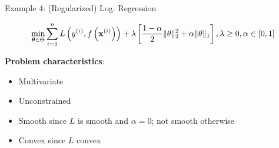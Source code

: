 \documentclass[11pt,compress,t,notes=noshow, xcolor=table]{beamer}
\begin{document}
\begin{vbframe}{Example 4: (Regularized) Log. Regression}
\framebreak

\begin{footnotesize}
\begin{eqnarray*}
	\min_{\bm{\theta} \in \Theta} \sum\limits_{i=1}^n L\left(y^{(i)}, f\left(\mathbf{x}^{(i)}\right)\right) + \lambda \left[\frac{1-\alpha}{2}\|\theta\|^{2}_{2} + \alpha\|\theta\|_{1}\right], \lambda \geq 0, \alpha \in [0,1]
\end{eqnarray*}
\end{footnotesize}

\textbf{Problem characteristics}:
\begin{itemize}
	\item Multivariate
	\item Unconstrained
	\item Smooth since $L$ is smooth and $\alpha = 0$; not smooth otherwise
	\item Convex since $L$ convex
\end{itemize}

\end{vbframe}
\end{document}
